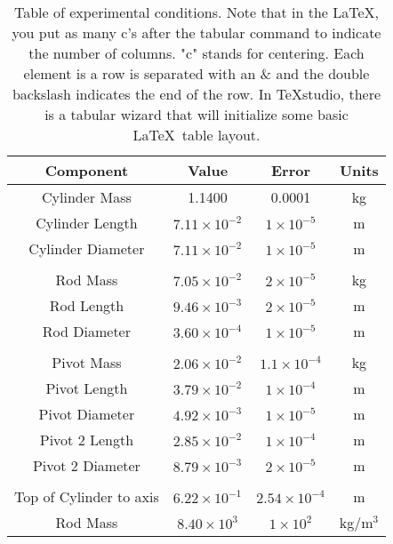 \documentclass[prb,preprint,groupaddress,showpacs,superbib,floats]{revtex4-1}
\begin{document}
\begin{table}[h]
\begin{ruledtabular}
\begin{tabular}{cccc}
	
\textbf{Component} & \textbf{Value} & \textbf{Error} & \textbf{Units} \\ 
\hline
Cylinder Mass & 1.1400  & 0.0001 & kg \\ 
Cylinder Length & $7.11 \times 10^{-2}$ & $1 \times 10^{-5}$ & m \\ 
Cylinder Diameter & $7.11 \times 10^{-2}$ & $1 \times 10^{-5}$ & m \\ 
		&  &  &  \\ 
Rod Mass & $7.05 \times 10^{-2}$  & $2 \times 10^{-5}$ & kg \\ 
Rod Length & $9.46 \times 10^{-3}$ & $2 \times 10^{-5}$ & m \\ 
Rod Diameter & $3.60 \times 10^{-4}$ & $1 \times 10^{-5}$ & m \\ 
		&  &  &  \\ 
Pivot Mass & $2.06 \times 10^{-2}$  & $1.1 \times 10^{-4}$ & kg \\ 
Pivot Length & $3.79 \times 10^{-2}$ & $1 \times 10^{-4}$ & m \\ 
Pivot Diameter & $4.92 \times 10^{-3}$ & $1 \times 10^{-5}$ & m \\ 
Pivot 2 Length & $2.85 \times 10^{-2}$ & $1 \times 10^{-4}$ & m \\ 
Pivot 2 Diameter & $8.79 \times 10^{-3}$ & $2 \times 10^{-5}$ & m \\ 
		&  &  &  \\ 
Top of Cylinder to axis & $6.22 \times 10^{-1}$ & $2.54 \times 10^{-4}$ & m \\ 
Rod Mass & $8.40 \times 10^3$  & $1 \times 10^2$ & kg/m$^3$ \\ 

\end{tabular}
\end{ruledtabular}
\caption{Table of experimental conditions.  Note that in the \LaTeX, you put as many c's after the tabular command to indicate the number of columns.  "c" stands for centering.  Each element is a row is separated with an \& and the double backslash indicates the end of the row.  In TeXstudio, there is a tabular wizard that will initialize some basic \LaTeX \ table layout. }
\label{expvalues}
\end{table}

\end{document}

